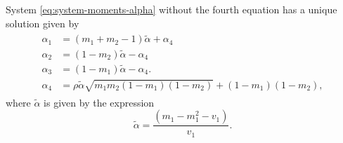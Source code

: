\begin{proposition}
  \label{prop:solution-to-system-bivariate-beta}
  System \eqref{eq:system-moments-alpha} without the fourth equation has a unique solution given by 
\begin{gather}
 \label{eq:system-solution}
 \begin{aligned}
  \alpha_1 &= (m_1 + m_2 - 1)\tilde{\alpha} + \alpha_4 \\
  \alpha_2 &=  (1 - m_2)\tilde{\alpha} - \alpha_4 \\
  \alpha_3 &= (1-m_1)\tilde{\alpha} - \alpha_4. \\
  \alpha_4 &= \rho\tilde{\alpha}\sqrt{m_1m_2(1-m_1)(1-m_2)} + (1-m_1)(1-m_2),
\end{aligned}
\end{gather}
where $\tilde{\alpha}$ is given by the expression 
$$
\tilde{\alpha} = \frac{(m_1 - m_1^2 - v_1)}{v_1}.
$$
\end{proposition}

